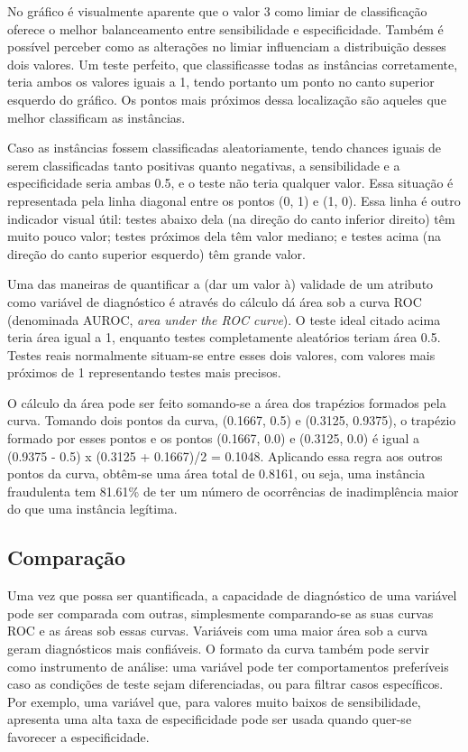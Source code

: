 No gráfico é visualmente aparente que o valor 3 como limiar de classificação oferece o melhor balanceamento entre sensibilidade e especificidade. Também é possível perceber como as alterações no limiar influenciam a distribuição desses dois valores. Um teste perfeito, que classificasse todas as instâncias corretamente, teria ambos os valores iguais a 1, tendo portanto um ponto no canto superior esquerdo do gráfico. Os pontos mais próximos dessa localização são aqueles que melhor classificam as instâncias.

Caso as instâncias fossem classificadas aleatoriamente, tendo chances iguais de serem classificadas tanto positivas quanto negativas, a sensibilidade e a especificidade seria ambas 0.5, e o teste não teria qualquer valor. Essa situação é representada pela linha diagonal entre os pontos (0, 1) e (1, 0). Essa linha é outro indicador visual útil: testes abaixo dela (na direção do canto inferior direito) têm muito pouco valor; testes próximos dela têm valor mediano; e testes acima (na direção do canto superior esquerdo) têm grande valor.

Uma das maneiras de quantificar a (dar um valor à) validade de um atributo como variável de diagnóstico é através do cálculo dá área sob a curva ROC (denominada AUROC, \emph{area under the ROC curve}). O teste ideal citado acima teria área igual a 1, enquanto testes completamente aleatórios teriam área 0.5. Testes reais normalmente situam-se entre esses dois valores, com valores mais próximos de 1 representando testes mais precisos.

O cálculo da área pode ser feito somando-se a área dos trapézios formados pela curva. Tomando dois pontos da curva, (0.1667, 0.5) e (0.3125, 0.9375), o trapézio formado por esses pontos e os pontos (0.1667, 0.0) e (0.3125, 0.0) é igual a (0.9375 - 0.5) x (0.3125 + 0.1667)/2 = 0.1048. Aplicando essa regra aos outros pontos da curva, obtêm-se uma área total de 0.8161, ou seja, uma instância fraudulenta tem 81.61\% de ter um número de ocorrências de inadimplência maior do que uma instância legítima.

\subsection{Comparação}

Uma vez que possa ser quantificada, a capacidade de diagnóstico de uma variável pode ser comparada com outras, simplesmente comparando-se as suas curvas ROC e as áreas sob essas curvas. Variáveis com uma maior área sob a curva geram diagnósticos mais confiáveis. O formato da curva também pode servir como instrumento de análise: uma variável pode ter comportamentos preferíveis caso as condições de teste sejam diferenciadas, ou para filtrar casos específicos. Por exemplo, uma variável que, para valores muito baixos de sensibilidade, apresenta uma alta taxa de especificidade pode ser usada quando quer-se favorecer a especificidade.

